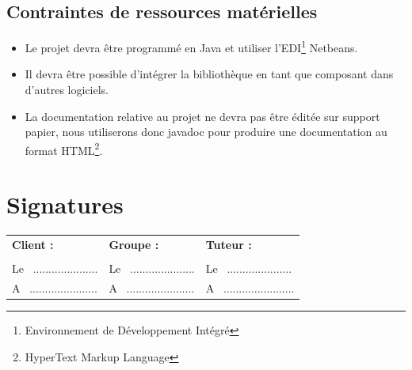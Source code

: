 \documentclass[12pt,a4paper,openany]{article}
\begin{document}
	\subsection{Contraintes de ressources matérielles}
	\begin{itemize}
		\item Le projet devra être programmé en Java et utiliser l'EDI\footnote{Environnement de Développement Intégré} Netbeans. 
		\item Il devra être possible d'intégrer la bibliothèque en tant que composant dans d'autres logiciels. 
		\item La documentation relative au projet ne devra pas être éditée sur support papier, nous utili\-serons donc javadoc pour produire une documentation 
	au format HTML\footnote{HyperText Markup Language}.  
	\end{itemize}
	

\section*{Signatures}
\vspace{20px}
\begin{tabular}[center]{p{175px}p{175px}p{175px}}
  \textbf{Client :} & \textbf{Groupe :} & \textbf{Tuteur :} \\
  \\
  Le ~..................... & Le ~..................... & Le ~..................... \\
  A ~...................... & A ~...................... & A ~....................... \\
\end{tabular}
\newpage
\appendix
\end{document}
